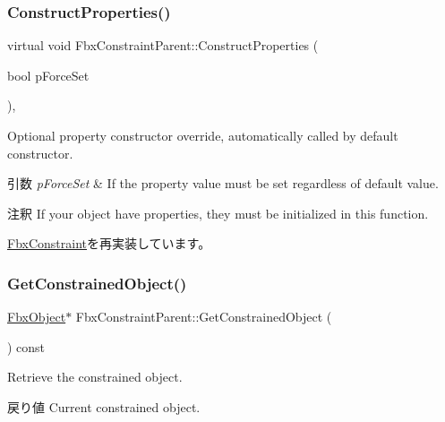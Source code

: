 \subsubsection{\texorpdfstring{Construct\+Properties()}{ConstructProperties()}}
{\footnotesize\ttfamily virtual void Fbx\+Constraint\+Parent\+::\+Construct\+Properties (\begin{DoxyParamCaption}\item[{bool}]{p\+Force\+Set }\end{DoxyParamCaption})\hspace{0.3cm}{\ttfamily [protected]}, {\ttfamily [virtual]}}

Optional property constructor override, automatically called by default constructor. 
\begin{DoxyParams}{引数}
{\em p\+Force\+Set} & If the property value must be set regardless of default value. \\
\hline
\end{DoxyParams}
\begin{DoxyRemark}{注釈}
If your object have properties, they must be initialized in this function. 
\end{DoxyRemark}


\hyperlink{class_fbx_constraint_a0470a25b813b337d07a03ce4b97b44f8}{Fbx\+Constraint}を再実装しています。

\mbox{\label{class_fbx_constraint_parent_a8c878a029a5628f328244f824d3f8847}} 
\subsubsection{\texorpdfstring{Get\+Constrained\+Object()}{GetConstrainedObject()}}
{\footnotesize\ttfamily \hyperlink{class_fbx_object}{Fbx\+Object}$\ast$ Fbx\+Constraint\+Parent\+::\+Get\+Constrained\+Object (\begin{DoxyParamCaption}{ }\end{DoxyParamCaption}) const\hspace{0.3cm}{\ttfamily [virtual]}}

Retrieve the constrained object. \begin{DoxyReturn}{戻り値}
Current constrained object. 
\end{DoxyReturn}


